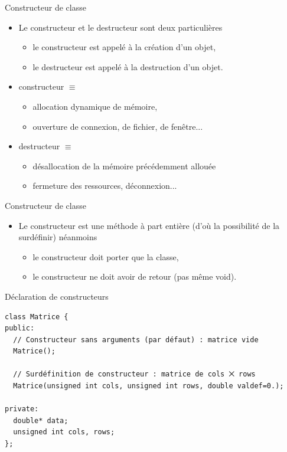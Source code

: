 \documentclass[c]{beamer}
\begin{document}
\begin{frame}[fragile]{Constructeur de classe}
\begin{itemize}
\item Le constructeur et le destructeur sont deux  particulières

\begin{itemize}
\item le constructeur est appelé à la création d'un objet,
\item le destructeur est appelé à la destruction d'un objet.
\end{itemize}

\item constructeur \(\equiv\) 
\begin{itemize}
\item allocation dynamique de mémoire,
\item ouverture de connexion, de fichier, de fenêtre...
\end{itemize}

\item destructeur \(\equiv\) 
\begin{itemize}
\item désallocation de la mémoire précédemment allouée
\item fermeture des ressources, déconnexion...
\end{itemize}

\end{itemize}
\end{frame}

\begin{frame}[fragile]{Constructeur de classe}
\begin{itemize}
\item Le constructeur est une méthode à part entière (d'où la possibilité de la
  surdéfinir) néanmoins
  
\begin{itemize}
\item le constructeur doit porter  que la classe,

\item le constructeur ne doit avoir  de retour (pas même void).
\end{itemize}
\end{itemize}
\end{frame}

\begin{frame}[fragile]{Déclaration de constructeurs}
\begin{verbatim}
class Matrice {
public:
  // Constructeur sans arguments (par défaut) : matrice vide
  Matrice();

  // Surdéfinition de constructeur : matrice de cols ⨉ rows
  Matrice(unsigned int cols, unsigned int rows, double valdef=0.);

private:
  double* data;
  unsigned int cols, rows;
};
\end{verbatim}
\end{frame}
\end{document}
